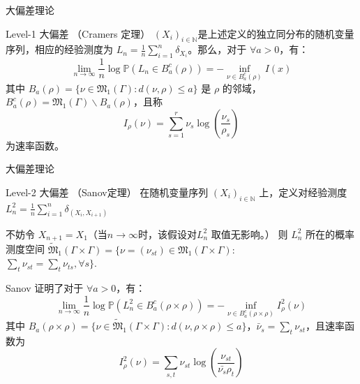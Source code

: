 \documentclass{beamer}
\begin{document}
\begin{frame}{大偏差理论}
	\begin{block}{Level-1 大偏差 （Cramers 定理）}
		$(\mathit{X}_i)_{i\in \mathbb{N}}$是上述定义的独立同分布的随机变量序列，相应的经验测度为 $\mathit{L}_n = \frac{1}{n} \sum_{i=1}^n \delta_{\mathit{X}_i}$。那么，对于 $\forall a>0$，有：
		$$
			\lim_{n \rightarrow \infty} \frac{1}{n} \log \mathbb{P} \left(\mathit{L}_n \in \mathit{B}_a^c(\rho)\right) = -\inf_{\nu \in \mathit{B}_a^c(\rho)} \mathit{I}(x)
		$$
		其中 $\mathit{B}_a(\rho)=\{\nu \in \mathfrak{M}_1(\Gamma): d(\nu,  \rho) \le a\}$ 是 $\rho$ 的邻域，$\mathit{B}_a^c(\rho) = \mathfrak{M}_1(\Gamma) \backslash  \mathit{B}_a(\rho)$，且称
		$$
			\mathit{I}_{\rho}(\nu) = \sum_{s=1}^r \nu_s \log \left(\frac{\nu_s}{\rho_s}\right)
		$$
		为速率函数。
	\end{block}
\end{frame}

\begin{frame}{大偏差理论}
	\begin{block}{Level-2 大偏差 （Sanov定理）}
		在随机变量序列 $(\mathit{X}_i)_{i\in \mathbb{N}}$ 上，定义对经验测度
		$\mathit{L}_n^2 = \frac{1}{n} \sum_{i=1}^n \delta_{(\mathit{X}_i, \mathit{X}_{i+1})}$

		不妨令 $\mathit{X}_{n+1} = \mathit{X}_1$（当$n\rightarrow \infty$时，该假设对$\mathit{L}_n^2$ 取值无影响。）
		则 $\mathit{L}_n^2$ 所在的概率测度空间
		$\widetilde{\mathfrak{M}}_1(\Gamma \times \Gamma) = \{\nu=(\nu_{st}) \in \mathfrak{M}_1(\Gamma \times \Gamma):$ \\$ \sum_{t} \nu_{st} = \sum_{t} \nu_{ts}, \forall s\}.$

			Sanov 证明了对于 $\forall a > 0$，有：
		$$
			\lim_{n \rightarrow \infty} \frac{1}{n} \log \mathbb{P}(\mathit{L}_n^2 \in B_a^c(\rho \times \rho))
			= - \inf_{\nu \in B_a^c(\rho \times \rho)} \mathit{I}_{\rho}^2(\nu)
		$$
		其中 $B_a(\rho \times \rho) = \{\nu \in \widetilde{\mathfrak{M}}_1(\Gamma \times \Gamma): d(\nu, \rho \times \rho) \le a\}$，$\bar{\nu}_s = \sum_t \nu_{st}$，且速率函数为
		$$
			\mathit{I}_{\rho}^2(\nu) = \sum_{s,t} \nu_{st} \log\left(\frac{\nu_{st}}{\bar{\nu_s}\rho_t}\right)
		$$
	\end{block}
\end{frame}
\end{document}
